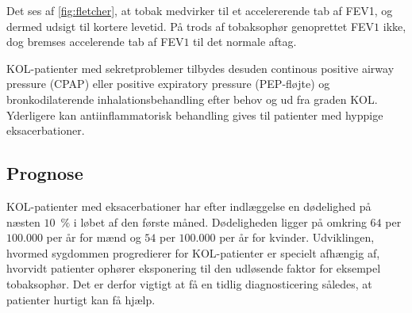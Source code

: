 \noindent
Det ses af \autoref{fig:fletcher}, at tobak medvirker til et accelererende tab af FEV1, og dermed udsigt til kortere levetid. På trods af tobaksophør genoprettet FEV$1$ ikke, dog bremses accelerende tab af FEV$1$ til det normale aftag.\cite{dsam2016}

KOL-patienter med sekretproblemer tilbydes desuden continous positive airway pressure (CPAP) eller positive expiratory pressure (PEP-fløjte) og bronkodilaterende inhalationsbehandling efter behov og ud fra graden KOL. Yderligere kan antiinflammatorisk behandling gives til patienter med hyppige eksacerbationer. \cite{Basisbogen2016}
 
\subsection{Prognose}
KOL-patienter med eksacerbationer har efter indlæggelse en dødelighed på næsten $10$~$\%$ i løbet af den første måned. Dødeligheden ligger på omkring $64$ per $100.000$ per år for mænd og $54$ per $100.000$ per år for kvinder.
Udviklingen, hvormed sygdommen progredierer for KOL-patienter er specielt afhængig af, hvorvidt patienter ophører eksponering til den udløsende faktor for eksempel tobaksophør. Det er derfor vigtigt at få en tidlig diagnosticering således, at patienter hurtigt kan få hjælp. \cite{dsam2016}

